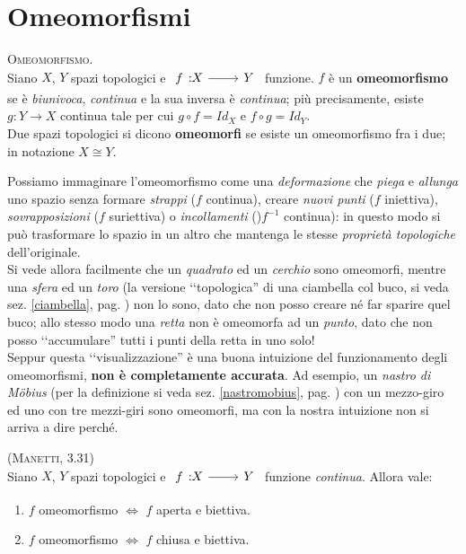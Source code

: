 \section{Omeomorfismi}
\begin{define}\textsc{Omeomorfismo.}\\
Siano $X$, $Y$ spazi topologici e $\funz{f}{X}{Y}$ funzione. $f$ è un \textbf{omeomorfismo} se è \textit{biunivoca}, \textit{continua} e la sua inversa è \textit{continua}; più precisamente, esiste $g\colon Y\rightarrow X$ continua tale per cui $g\circ f = Id_{X}$ e $f\circ g = Id_{Y}$.\\
Due spazi topologici si dicono \textbf{omeomorfi} se esiste un omeomorfismo fra i due; in notazione $X\cong Y$.
\end{define}
\begin{intuit}
	Possiamo immaginare l'omeomorfismo come una \textit{deformazione} che \textit{piega} e \textit{allunga} uno spazio senza formare \textit{strappi} ($f$ continua), creare \textit{nuovi punti} ($f$ iniettiva), \textit{sovrapposizioni} ($f$ suriettiva) o \textit{incollamenti} ()$f^{-1}$ continua): in questo modo si può trasformare lo spazio in un altro che mantenga le stesse \textit{proprietà topologiche} dell'originale.\\
	Si vede allora facilmente che un \textit{quadrato} ed un \textit{cerchio} sono omeomorfi, mentre una \textit{sfera} ed un \textit{toro} (la versione ‘‘topologica'' di una ciambella col buco, si veda sez. \ref{ciambella}, pag. \pageref{ciambella}) non lo sono, dato che non posso creare né far sparire quel buco; allo stesso modo una \textit{retta} non è omeomorfa ad un \textit{punto}, dato che non posso ‘‘accumulare'' tutti i punti della retta in uno solo!\\
	Seppur questa ‘‘visualizzazione'' è una buona intuizione del funzionamento degli omeomorfismi, \textbf{non è completamente accurata}. Ad esempio, un \textit{nastro di Möbius} (per la definizione si veda sez. \ref{nastromobius}, pag. \pageref{nastromobius}) con un mezzo-giro ed uno con tre mezzi-giri sono omeomorfi, ma con la nostra intuizione non si arriva a dire perché.
\end{intuit}
\begin{lemming}\textsc{(Manetti, 3.31)}\\
Siano $X$, $Y$ spazi topologici e $\funz{f}{X}{Y}$ funzione \textit{continua}. Allora vale:
\begin{enumerate}
\item $f$ omeomorfismo $\iff$ $f$ aperta e biettiva.
\item $f$ omeomorfismo $\iff$ $f$ chiusa e biettiva.
\end{enumerate}
\vspace{-3mm}
\end{lemming}
